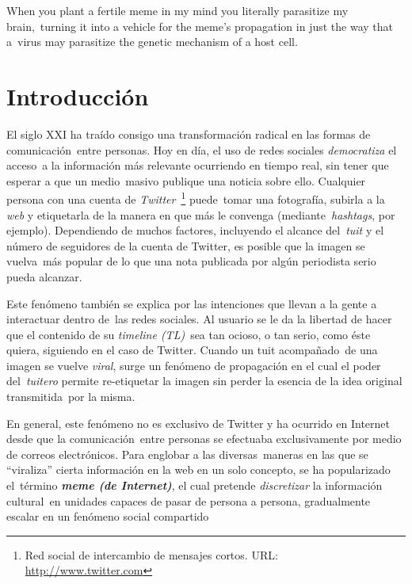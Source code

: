 \begin{savequote}[45mm]
  When you plant a fertile meme in my mind you literally parasitize my brain,\
  turning it into a vehicle for the meme's propagation in just the way that a\
  virus may parasitize the genetic mechanism of a host cell.
  \qauthor{Richard Dawkins \cite{dawkins2006}}
\end{savequote}

\chapter{Introducción}

\noindent
El siglo XXI ha traído consigo una transformación radical en las formas de comunicación\
entre personas. Hoy en día, el uso de redes sociales \emph{democratiza} el acceso\
a la información más relevante ocurriendo en tiempo real, sin tener que esperar a que un medio\
masivo publique una noticia sobre ello. Cualquier persona con una cuenta de \textit{Twitter}\
\footnote{Red social de intercambio de mensajes cortos. URL: \url{http://www.twitter.com}} puede\
tomar una fotografía, subirla a la \textit{web} y etiquetarla de la manera en que más le convenga (mediante\
\textit{hashtags}, por ejemplo). Dependiendo de muchos factores, incluyendo el alcance del\
\textit{tuit} y el número de seguidores de la cuenta de Twitter, es posible que la imagen se vuelva\
más popular de lo que una nota publicada por algún periodista serio pueda alcanzar.\par
Este fenómeno también se explica por las intenciones que llevan a la gente a interactuar dentro de\
las redes sociales. Al usuario se le da la libertad de hacer que el contenido de su \textit{timeline (TL)}\
sea tan ocioso, o tan serio, como éste quiera, siguiendo en el caso de Twitter. Cuando un tuit acompañado\
de una imagen se vuelve \emph{viral}, surge un fenómeno de propagación en el cual el poder del\
\textit{tuitero} permite re-etiquetar la imagen sin perder la esencia de la idea original transmitida\
por la misma.\par
En general, este fenómeno no es exclusivo de Twitter y ha ocurrido en Internet desde que la comunicación\
entre personas se efectuaba exclusivamente por medio de correos electrónicos. Para englobar a las diversas\
maneras en las que se ``viraliza'' cierta información en la web en un solo concepto, se ha popularizado el\
término \emph{\textbf{meme (de Internet)}}, el cual pretende \emph{discretizar} la información cultural\
en unidades capaces de pasar de persona a persona, gradualmente escalar en un fenómeno social compartido\

